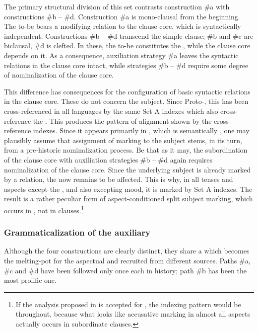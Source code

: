 \documentclass[output=paper]{langsci/langscibook}
\begin{document}
The primary structural division of this set contrasts construction \#a with constructions \#b – \#d. Construction \#a is mono-clausal from the beginning. The  to-be bears a modifying relation to the clause core, which is syntactically independent. Constructions \#b – \#d transcend the simple clause; \#b and \#c are biclausal, \#d is clefted. In these, the  to-be constitutes the , while the clause core depends on it. As a consequence, auxiliation strategy \#a leaves the syntactic relations in the clause core intact, while strategies \#b – \#d require some degree of nominalization of the clause core.

\largerpage[1]
This difference has consequences for the configuration of basic syntactic relations in the clause core. These do not concern the  subject. Since Proto-, this has been cross-referenced in all  languages by the same Set A indexes which also cross-reference the . This produces the  pattern of alignment shown by the cross-reference indexes. Since it appears primarily in , which is semantically , one may plausibly assume that assignment of  marking to the  subject stems, in its turn, from a pre-historic nominalization process. Be that as it may, the subordination of the clause core with auxiliation strategies \#b – \#d again requires nominalization of the clause core. Since the underlying  subject is already marked by a  relation, the  now remains to be affected. This is why, in all tenses and aspects except the , and also excepting  mood, it is marked by Set A indexes. The result is a rather peculiar form of aspect-conditioned split subject marking, which occurs in , not in  clauses.\footnote{ If the analysis proposed in \citet[§6]{Coon2010} is accepted for , the indexing pattern would be  throughout, because what looks like accusative marking in almost all aspects actually occurs in subordinate clauses.}

\subsubsection{Grammaticalization of the auxiliary}\label{sec:lehmann:4.10.2}
Although the four constructions are clearly distinct, they share a  which becomes the melting-pot for the aspectual and   recruited from different sources. Paths \#a, \#c and \#d have been followed only once each in history; path \#b has been the most prolific one.
\end{document}
